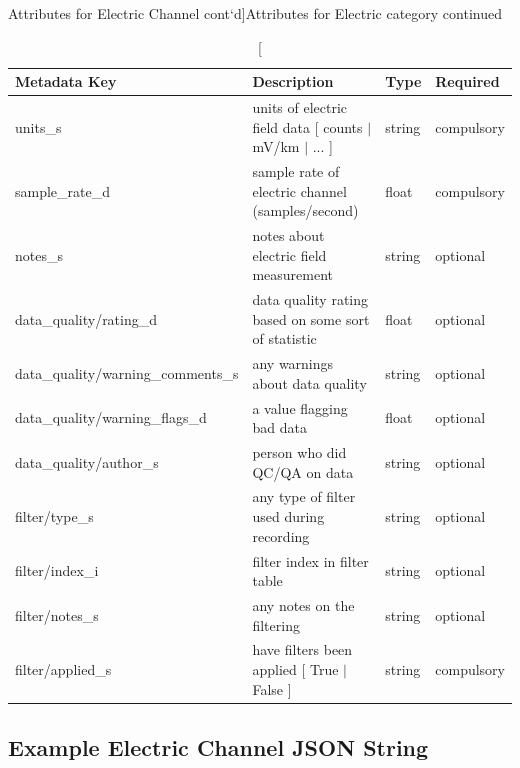 \documentclass{article}
\begin{document}
\newpage
\begin{table}[htb!]
	\caption[Attributes for Electric Channel cont`d]{Attributes for Electric category continued}
	\begin{tabular}{|l|p{3in}|l|l|}
		\hline
		\textbf{Metadata Key} & \textbf{Description} & \textbf{Type} & \textbf{Required} \\ \hline
		units\_s & units of electric field data [ counts $|$ mV/km $|$ ... ] & string & compulsory \\ \hline
		sample\_rate\_d & sample rate of electric channel (samples/second) & float & compulsory \\ \hline
		notes\_s & notes about electric field measurement & string &  optional \\ \hline
		data\_quality/rating\_d & data quality rating based on some sort of statistic & float & optional \\ \hline
		data\_quality/warning\_comments\_s & any warnings about data quality & string & optional \\ \hline
		data\_quality/warning\_flags\_d & a value flagging bad data  & float &  optional \\ \hline
		data\_quality/author\_s & person who did QC/QA on data & string &  optional \\ \hline
		filter/type\_s & any type of filter used during recording & string &  optional \\ \hline
		filter/index\_i & filter index in filter table & string &  optional \\ \hline
		filter/notes\_s & any notes on the filtering & string &  optional \\ \hline
		filter/applied\_s & have filters been applied [ True $|$ False ] & string & compulsory \\ \hline
		\end{tabular}
		\label{tab:electric02}
\end{table}	

\newpage
\subsection{Example Electric Channel JSON String}
\end{document}
